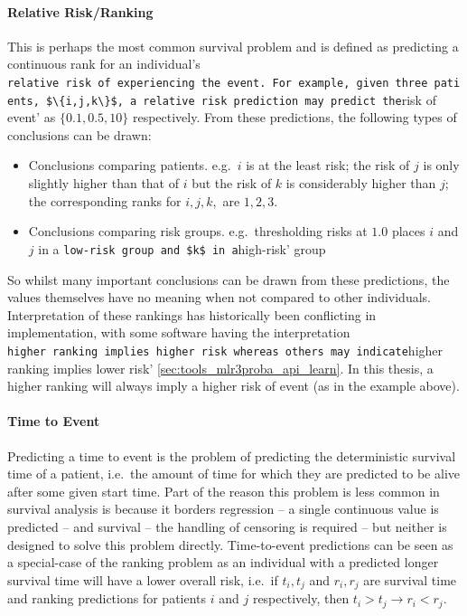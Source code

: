 \documentclass[
  letterpaper,
]{scrbook}
\let\oldparagraph\paragraph
\renewcommand{\paragraph}[1]{\oldparagraph{#1}\mbox{}}
\providecommand{\tightlist}{%
  \setlength{\itemsep}{0pt}\setlength{\parskip}{0pt}}\usepackage{longtable,booktabs,array}
\theoremstyle{plain}
\theoremstyle{definition}
\theoremstyle{remark}
\begin{document}
\paragraph{Relative Risk/Ranking}

This is perhaps the most common survival problem and is defined as
predicting a continuous rank for an individual's
\texttt{relative\ risk\ of\ experiencing\ the\ event\textquotesingle{}.\ For\ example,\ given\ three\ patients,\ \$\textbackslash{}\{i,j,k\textbackslash{}\}\$,\ a\ relative\ risk\ prediction\ may\ predict\ the}risk
of event' as \(\{0.1, 0.5, 10\}\) respectively. From these predictions,
the following types of conclusions can be drawn:

\begin{itemize}
\tightlist
\item
  Conclusions comparing patients. e.g.~\(i\) is at the least risk; the
  risk of \(j\) is only slightly higher than that of \(i\) but the risk
  of \(k\) is considerably higher than \(j\); the corresponding ranks
  for \(i,j,k,\) are \(1,2,3\).
\item
  Conclusions comparing risk groups. e.g.~thresholding risks at \(1.0\)
  places \(i\) and \(j\) in a
  \texttt{low-risk\textquotesingle{}\ group\ and\ \$k\$\ in\ a}high-risk'
  group
\end{itemize}

So whilst many important conclusions can be drawn from these
predictions, the values themselves have no meaning when not compared to
other individuals. Interpretation of these rankings has historically
been conflicting in implementation, with some software having the
interpretation
\texttt{higher\ ranking\ implies\ higher\ risk\textquotesingle{}\ whereas\ others\ may\ indicate}higher
ranking implies lower risk' \ref{sec:tools_mlr3proba_api_learn}. In this
thesis, a higher ranking will always imply a higher risk of event (as in
the example above).

\paragraph{Time to Event}

Predicting a time to event is the problem of predicting the
deterministic survival time of a patient, i.e.~the amount of time for
which they are predicted to be alive after some given start time. Part
of the reason this problem is less common in survival analysis is
because it borders regression -- a single continuous value is predicted
-- and survival -- the handling of censoring is required -- but neither
is designed to solve this problem directly. Time-to-event predictions
can be seen as a special-case of the ranking problem as an individual
with a predicted longer survival time will have a lower overall risk,
i.e.~if \(t_i,t_j\) and \(r_i,r_j\) are survival time and ranking
predictions for patients \(i\) and \(j\) respectively, then
\(t_i > t_j \rightarrow r_i < r_j\).
\end{document}
